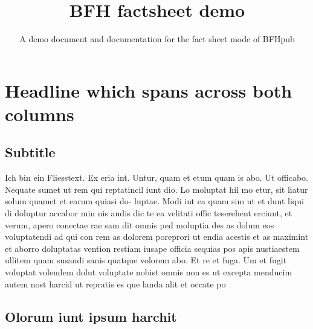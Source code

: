 \documentclass[
	trilingual,
	type=factsheet,
	headings=big,
]{bfhpub}
\begin{document}
\enableHeadLineLogo

\title{BFH factsheet demo}
\subtitle{A demo document and documentation for the fact sheet mode of BFHpub}

\subject{Das ist ein Teaser auf dem Titelblatt. Inveniat odis vid quist eos ut
	odicidi psandaest, omnis ex et re laborep eribusamet es ulluptaquia
	suntur se nihic in eum dero eossit, nihil imaximi llatus repta.}



\maketitle

\section{Headline which spans across both columns}

\subsection{Subtitle}
Ich bin ein Fliesstext. Ex eria int. Untur, quam et etum quam is
abo. Ut officabo. Nequate sumet ut rem qui reptatincil iunt dio. Lo
moluptat hil mo etur, sit liatur solum quamet et earum quiasi do-
luptae. Modi int ea quam sim ut et dunt liqui di doluptur accabor
min nis audis dic te ea velitati offic teserehent erciunt, et verum,
apero conectae rae sam dit omnis ped moluptia des as dolum eos
voluptatendi ad qui con rem as dolorem poreprori ut endia acestis
et as maximint et aborro doluptatas vention restiam iusape officia
sequias pos apis nustiaestem ullitem quam susandi sanis quatque
volorem abo. Et re et fuga. Um et fugit voluptat volendem dolut
voluptate nobist omnis non es ut excepta menducim autem nost
harcid ut repratis es que landa alit et occate po

\subsection{Olorum iunt ipsum harchit}
\end{document}
